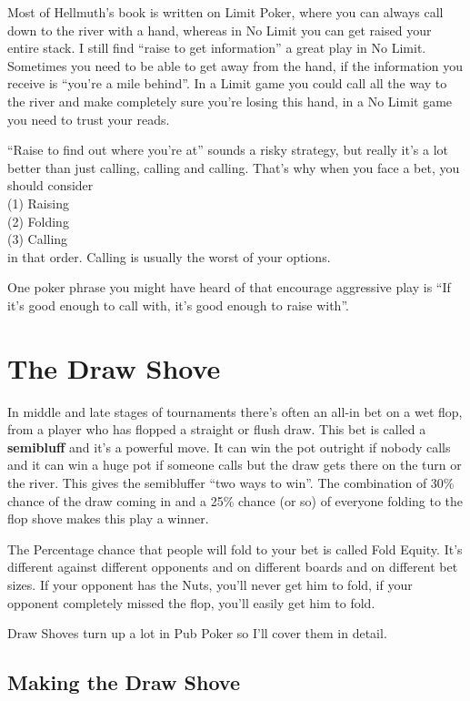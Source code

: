 Most of Hellmuth's book is written on Limit Poker, where you can always
call down to the river with a hand, whereas in No Limit you can get
raised your entire stack. I still find ``raise to get
information'' a great play in No Limit. Sometimes you need to
be able to get away from the hand, if the information you receive
is ``you're a mile behind''. In a Limit game you could call all the
way to the river and make completely sure you're losing this hand, in
a No Limit game you need to trust your reads.

``Raise to find out where you're at'' sounds a risky strategy,
but really it's a lot better than just calling, calling and calling.
That's why when you face a bet, you should consider \\
(1) Raising \\
(2) Folding \\
(3) Calling \\
in that order. Calling is usually the worst of your options.

One poker phrase you might have heard of that encourage aggressive play is
``If it's good enough to call with, it's good enough to raise with''.

\section{The Draw Shove}

In middle and late stages of tournaments there's often an all-in bet
on a wet flop, from a player who has flopped a straight or flush draw.
This bet is called a \textbf{semibluff} and it's a powerful move.
It can win the pot outright if nobody calls and it can win a huge pot
if someone calls but the draw gets there on the turn or the river.
This gives the semibluffer ``two ways to win''. The combination
of 30\% chance of the draw coming in and a 25\% chance (or so) of
everyone folding to the flop shove makes this play a winner.

The Percentage chance that people will fold to your bet is
called Fold Equity. It's different against different opponents
and on different boards and on different bet sizes. If your opponent has
the Nuts, you'll never get him to fold, if your opponent completely
missed the flop, you'll easily get him to fold.

Draw Shoves turn up a lot in Pub Poker so I'll cover them in detail.

\subsection{Making the Draw Shove}

